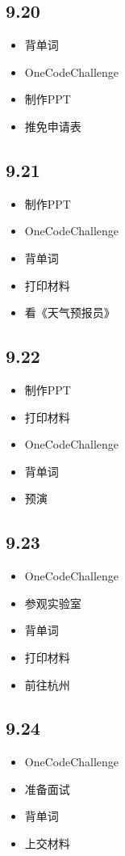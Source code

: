 \documentclass[UTF8]{ctexart}
\begin{document}
\subsection*{9.20}
\begin{itemize}
    \item 背单词
    \item OneCodeChallenge
    \item 制作PPT
    \item 推免申请表
\end{itemize}

\subsection*{9.21}
\begin{itemize}
    \item 制作PPT
    \item OneCodeChallenge
    \item 背单词
    \item 打印材料
    \item 看《天气预报员》
\end{itemize}

\subsection*{9.22}
\begin{itemize}
    \item 制作PPT
    \item 打印材料
    \item OneCodeChallenge
    \item 背单词
    \item 预演
\end{itemize}

\subsection*{9.23}
\begin{itemize}
    \item OneCodeChallenge
    \item 参观实验室
    \item 背单词
    \item 打印材料
    \item 前往杭州
\end{itemize}

\subsection*{9.24}
\begin{itemize}
    \item OneCodeChallenge
    \item 准备面试
    \item 背单词
    \item 上交材料
\end{itemize}
\end{document}
